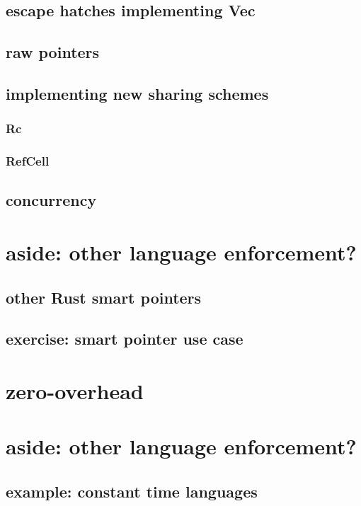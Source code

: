 \subsection{escape hatches implementing Vec}


\subsection{raw pointers}



\subsection{implementing new sharing schemes}

\subsubsection{Rc}


\subsubsection{RefCell}


\subsection{concurrency}


\section{aside: other language enforcement?}



\subsection{other Rust smart pointers}

\subsection{exercise: smart pointer use case}



\section{zero-overhead}


\section{aside: other language enforcement?}


\subsection{example: constant time languages}


